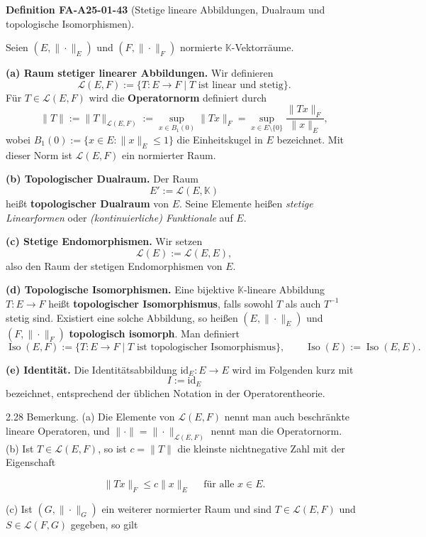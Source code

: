 \documentclass[10pt, letterpaper]{article}
\newcommand{\CustomHeading}[3]{%
  \par\medskip\noindent%
  \textbf{#1 #2} \textnormal{(#3)}.\enskip%
}
\newenvironment{DEF}[2]{\begin{unitbox}\CustomHeading{Definition}{#1}{#2}}{\end{unitbox}}
\begin{document}
\begin{DEF}{FA-A25-01-43}{Stetige lineare Abbildungen, Dualraum und topologische Isomorphismen}
Seien $(E,\|\cdot\|_E)$ und $(F,\|\cdot\|_F)$ normierte $\mathbb{K}$-Vektorräume.

\textbf{(a) Raum stetiger linearer Abbildungen.}  
Wir definieren
\[
\mathcal{L}(E,F):=\{T:E\to F\mid T\text{ ist linear und stetig}\}.
\]
Für $T\in\mathcal{L}(E,F)$ wird die \textbf{Operatornorm} definiert durch
\[
\|T\|:=\|T\|_{\mathcal{L}(E,F)}:=\sup_{x\in B_1(0)}\|Tx\|_F
=\sup_{x\in E\setminus\{0\}}\frac{\|Tx\|_F}{\|x\|_E},
\]
wobei $B_1(0):=\{x\in E:\|x\|_E\le1\}$ die Einheitskugel in $E$ bezeichnet.  
Mit dieser Norm ist $\mathcal{L}(E,F)$ ein normierter Raum.

\textbf{(b) Topologischer Dualraum.}  
Der Raum
\[
E':=\mathcal{L}(E,\mathbb{K})
\]
heißt \textbf{topologischer Dualraum} von $E$.  
Seine Elemente heißen \emph{stetige Linearformen} oder \emph{(kontinuierliche) Funktionale} auf $E$.

\textbf{(c) Stetige Endomorphismen.}  
Wir setzen
\[
\mathcal{L}(E):=\mathcal{L}(E,E),
\]
also den Raum der stetigen Endomorphismen von $E$.

\textbf{(d) Topologische Isomorphismen.}  
Eine bijektive $\mathbb{K}$-lineare Abbildung $T:E\to F$ heißt \textbf{topologischer Isomorphismus},  
falls sowohl $T$ als auch $T^{-1}$ stetig sind.  
Existiert eine solche Abbildung, so heißen $(E,\|\cdot\|_E)$ und $(F,\|\cdot\|_F)$ \textbf{topologisch isomorph}.  
Man definiert
\[
\operatorname{Iso}(E,F):=\{T:E\to F\mid T \text{ ist topologischer Isomorphismus}\},
\qquad
\operatorname{Iso}(E):=\operatorname{Iso}(E,E).
\]

\textbf{(e) Identität.}  
Die Identitätsabbildung $\mathrm{id}_E:E\to E$ wird im Folgenden kurz mit
\[
I:=\mathrm{id}_E
\]
bezeichnet, entsprechend der üblichen Notation in der Operatorentheorie.
\end{DEF}




2.28 Bemerkung. (a) Die Elemente von $\mathcal{L}(E, F)$ nennt man auch beschränkte lineare Operatoren, und $\|\cdot\|=\|\cdot\|_{\mathcal{L}(E, F)}$ nennt man die Operatornorm.\\
(b) Ist $T \in \mathcal{L}(E, F)$, so ist $c=\|T\|$ die kleinste nichtnegative Zahl mit der Eigenschaft

$$
\|T x\|_{F} \leq c\|x\|_{E} \quad \text { für alle } x \in E .
$$

(c) Ist $\left(G,\|\cdot\|_{G}\right)$ ein weiterer normierter Raum und sind $T \in \mathcal{L}(E, F)$ und $S \in \mathcal{L}(F, G)$ gegeben, so gilt
\end{document}
